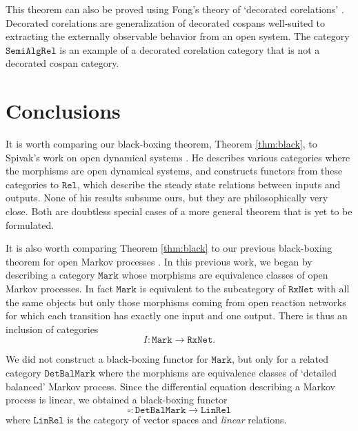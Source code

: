 \documentclass{compositionalityarticle}
\newcommand{\RxNet}{\mathtt{RxNet}}
\newcommand{\Mark}{\mathtt{Mark}}
\newcommand{\DetBalMark}{\mathtt{DetBalMark}}
\newcommand{\Rel}{\mathtt{Rel}}
\newcommand{\LinRel}{\mathtt{LinRel}}
\newcommand{\SemiAlgRel}{\mathtt{SemiAlgRel}}
\newcommand{\maps}{\colon}
\theoremstyle{compositionality}
\theoremstyle{remark}
\begin{document}
This theorem can also be proved using Fong's theory of `decorated corelations' \cite{FongThesis,Fong2017}.  Decorated corelations are generalization of decorated cospans well-suited to extracting the externally observable behavior from an open system.    The category 
$\SemiAlgRel$ is an example of a decorated corelation category that is not a decorated cospan category.

\section{Conclusions}
\label{sec:conclusions}

It is worth comparing our black-boxing theorem, Theorem \ref{thm:black}, to Spivak's work on open dynamical systems \cite{Spivak}.  He describes various  categories where the morphisms are open dynamical systems, and constructs functors from these categories to $\Rel$, which describe the steady state relations between inputs and outputs.  None of his results subsume ours, but they are philosophically very close.  Both are doubtless special cases of a more general theorem that is yet to be formulated.

It is also worth comparing Theorem \ref{thm:black} to our previous black-boxing theorem for open Markov processes \cite{BaezFongPollard}.  In this previous work, we began by describing a category $\Mark$ whose morphisms are equivalence classes of open Markov processes.  In fact $\Mark$ is equivalent to the subcategory of $\RxNet$ with all the same objects but only those morphisms coming from open reaction networks for which each transition has exactly one input and one output.  There is
thus an inclusion of categories
\[        I \maps \Mark \to \RxNet .\]

We did not construct a black-boxing functor for $\Mark$, but only for a related category $\DetBalMark$ where the morphisms are equivalence classes of `detailed balanced' Markov process.  Since the differential equation describing a Markov process is linear, we obtained a black-boxing functor
\[  \square \maps \DetBalMark \to \LinRel  \]
where $\LinRel$ is the category of vector spaces and \emph{linear} relations.    
\end{document}
